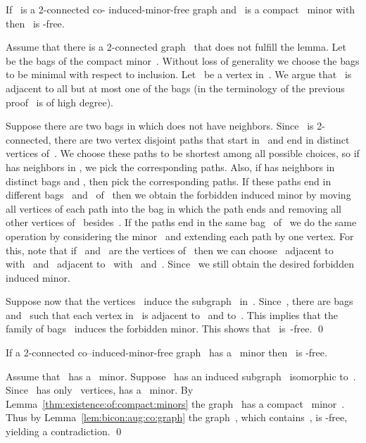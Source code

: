\documentclass[envcountsame,envcountsect,11pt,a4paper]{llncs}
\renewenvironment{proof}{\begin{Proof}}{\qed\end{Proof}}
\begin{document}
\begin{lemma}
\label{lem:bicon:aug:co:graph}
If~ is a 2-connected co- induced-minor-free graph and~ is a compact~ minor with~ then~ is -free. 
\end{lemma}
\begin{proof}
Assume that there is a 2-connected graph~ that does not fulfill the lemma.
Let~ be the bags of the compact minor~. Without loss of generality we choose the bags to be minimal with respect to inclusion.
Let~ be a vertex in~. We argue that~ is adjacent to all but at most one of the bags (in the terminology of the previous proof~ is of high degree).

Suppose there are two bags in which  does not have neighbors.
Since~ is 2-connected, there are two vertex disjoint paths that start in~ and end in distinct vertices of~. We choose these paths to be
shortest among all possible choices, so if  has neighbors in , we pick the corresponding paths. Also, if  has neighbors in
distinct bags  and , then pick the corresponding paths.
If these paths end in different bags~ and~ of~ then we obtain the forbidden induced minor by moving all
vertices of each path into the bag in which the path ends and removing all other vertices of~ besides~. If the paths end in the same
bag~ of~ we do the same operation by considering the minor~ and extending each path by one vertex. For this, note that
if~ and~ are the vertices of~ then we can choose~ adjacent to~ with~ and~ adjacent to~ with~
and~.
Since~ we still obtain the desired forbidden induced minor.

Suppose now that the vertices~ induce the subgraph~ in~.
Since~, there are bags~ and~ such that each vertex in~ is adjacent to~ and to~. This implies that the family of bags~ induces the forbidden minor. This shows that~ is~-free.
\end{proof}

\begin{corollary}
\label{cor:minor-free}
If a 2-connected co--induced-minor-free graph~ has a~ minor then~ is -free.
\end{corollary}
\begin{proof}
Assume that~ has a~ minor. 
Suppose~ has an induced subgraph~ isomorphic to~. Since~ has only~ vertices,
 has a~ minor. By Lemma~\ref{thm:existence:of:compact:minors} the graph~ has a compact~ minor~.
Thus by Lemma~\ref{lem:bicon:aug:co:graph} the graph~, which contains~, is -free, yielding a contradiction.
\end{proof}
\end{document}
